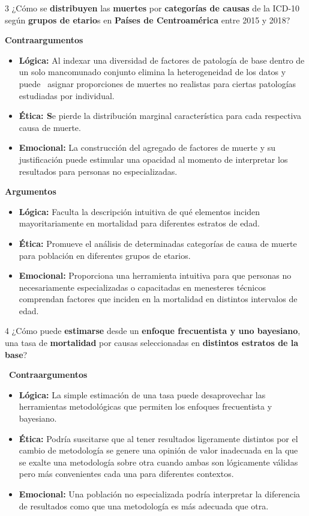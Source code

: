 \documentclass[
  letterpaper,
  DIV=11,
  numbers=noendperiod]{scrartcl}
\begin{document}
3 ¿Cómo se \textbf{distribuyen} las \textbf{muertes} por
\textbf{categorías de causas} de la ICD-10 según \textbf{grupos de
etario}s en \textbf{Países de Centroamérica} entre 2015 y 2018?

\textbf{Contraargumentos}

\begin{itemize}
\item
  \textbf{Lógica:} Al indexar una diversidad de factores de patología de
  base dentro de un solo mancomunado conjunto elimina la heterogeneidad
  de los datos y puede~ asignar proporciones de muertes no realistas
  para ciertas patologías estudiadas por individual.
\item
  \textbf{Ética: S}e pierde la distribución marginal característica para
  cada respectiva causa de muerte.
\item
  \textbf{Emocional:} La construcción del agregado de factores de muerte
  y su justificación puede estimular una opacidad al momento de
  interpretar los resultados para personas no especializadas.~
\end{itemize}

\textbf{Argumentos}

\begin{itemize}
\item
  \textbf{Lógica:} Faculta la descripción intuitiva de qué elementos
  inciden mayoritariamente en mortalidad para diferentes estratos de
  edad.
\item
  \textbf{Ética:} Promueve el análisis de determinadas categorías de
  causa de muerte para población en diferentes grupos de etarios.~
\item
  \textbf{Emocional:} Proporciona una herramienta intuitiva para que
  personas no necesariamente especializadas o capacitadas en menesteres
  técnicos comprendan factores que inciden en la mortalidad en distintos
  intervalos de edad.
\end{itemize}

4 ¿Cómo puede \textbf{estimarse} desde un \textbf{enfoque frecuentista y
uno bayesiano}, una tasa de \textbf{mortalidad} por causas seleccionadas
en \textbf{distintos estratos de la base}?

~\textbf{Contraargumentos}

\begin{itemize}
\item
  \textbf{Lógica:} La simple estimación de una tasa puede desaprovechar
  las herramientas metodológicas que permiten los enfoques frecuentista
  y bayesiano.
\item
  \textbf{Ética:} Podría suscitarse que al tener resultados ligeramente
  distintos por el cambio de metodología se genere una opinión de valor
  inadecuada en la que se exalte una metodología sobre otra cuando ambas
  son lógicamente válidas pero más convenientes cada una para diferentes
  contextos.
\item
  \textbf{Emocional:} Una población no especializada podría interpretar
  la diferencia de resultados como que una metodología es más adecuada
  que otra.
\end{itemize}
\end{document}
